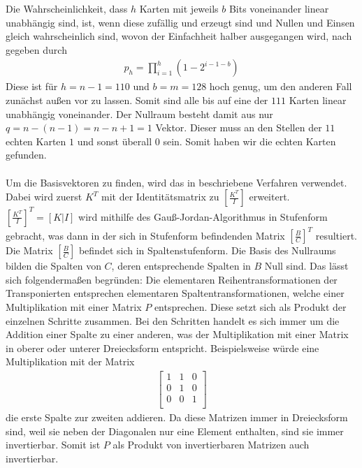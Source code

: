 \documentclass[a4paper,10pt,ngerman]{scrartcl}
\begin{document}
Die Wahrscheinlichkeit, dass $h$ Karten mit jeweils $b$ Bits voneinander linear unabhängig sind, ist, wenn diese zufällig und erzeugt sind und Nullen und Einsen gleich wahrscheinlich sind, wovon der Einfachheit halber ausgegangen wird, nach \cite{WEBSITE:1} gegeben durch
\begin{align*}
p_h = \prod^h_{i=1} (1-2^{i-1-b})
\end{align*}
Diese ist für $h=n-1=110$ und $b=m=128$ hoch genug, um den anderen Fall zunächst außen vor zu lassen. Somit sind alle bis auf eine der $111$ Karten linear unabhängig voneinander. Der Nullraum besteht damit aus nur $q=n-(n-1)=n-n+1=1$ Vektor. Dieser muss an den Stellen der $11$ echten Karten $1$ und sonst überall $0$ sein. Somit haben wir die echten Karten gefunden. \\\\
Um die Basisvektoren zu finden, wird das in \cite{WEBSITE:2} beschriebene Verfahren verwendet. Dabei wird zuerst $K^T$ mit der Identitätsmatrix zu $\left[\frac{K^T}{I}\right]$ erweitert. $\left[\frac{K^T}{I}\right]^T=[K|I]$ wird mithilfe des Gauß-Jordan-Algorithmus in Stufenform gebracht, was dann in der sich in Stufenform befindenden Matrix $\left[\frac{B}{C}\right]^T$ resultiert. Die Matrix $\left[\frac{B}{C}\right]$ befindet sich in Spaltenstufenform. Die Basis des Nullraums bilden die Spalten von $C$, deren entsprechende Spalten in $B$ Null sind. Das lässt sich folgendermaßen begründen: Die elementaren Reihentransformationen der Transponierten entsprechen elementaren Spaltentransformationen, welche einer Multiplikation mit einer Matrix $P$ entsprechen. Diese setzt sich als Produkt der einzelnen Schritte zusammen. Bei den Schritten handelt es sich immer um die Addition einer Spalte zu einer anderen, was der Multiplikation mit einer Matrix in oberer oder unterer Dreiecksform entspricht. Beispielsweise würde eine Multiplikation mit der Matrix
\begin{align*}
\left[\begin{array}{ccc}
1 & 1 & 0 \\
0 & 1 & 0 \\
0 & 0 & 1 \\
\end{array}\right]
\end{align*}
die erste Spalte zur zweiten addieren. Da diese Matrizen immer in Dreiecksform sind, weil sie neben der Diagonalen nur eine Element enthalten, sind sie immer invertierbar. Somit ist $P$ als Produkt von invertierbaren Matrizen auch invertierbar. \\
\end{document}
